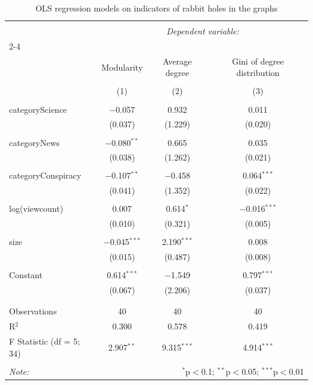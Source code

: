 
\begin{table}[!htbp] \centering 
  \caption{OLS regression models on indicators of rabbit holes in the graphs} 
  \label{} 
\begin{tabular}{@{\extracolsep{5pt}}lccc} 
\\[-1.8ex]\hline 
\hline \\[-1.8ex] 
 & \multicolumn{3}{c}{\textit{Dependent variable:}} \\ 
\cline{2-4} 
\\[-1.8ex] & Modularity & Average degree & Gini of degree distribution \\ 
\\[-1.8ex] & (1) & (2) & (3)\\ 
\hline \\[-1.8ex] 
 categoryScience & $-$0.057 & 0.932 & 0.011 \\ 
  & (0.037) & (1.229) & (0.020) \\ 
  & & & \\ 
 categoryNews & $-$0.080$^{**}$ & 0.665 & 0.035 \\ 
  & (0.038) & (1.262) & (0.021) \\ 
  & & & \\ 
 categoryConspiracy & $-$0.107$^{**}$ & $-$0.458 & 0.064$^{***}$ \\ 
  & (0.041) & (1.352) & (0.022) \\ 
  & & & \\ 
 log(viewcount) & 0.007 & 0.614$^{*}$ & $-$0.016$^{***}$ \\ 
  & (0.010) & (0.321) & (0.005) \\ 
  & & & \\ 
 size & $-$0.045$^{***}$ & 2.190$^{***}$ & 0.008 \\ 
  & (0.015) & (0.487) & (0.008) \\ 
  & & & \\ 
 Constant & 0.614$^{***}$ & $-$1.549 & 0.797$^{***}$ \\ 
  & (0.067) & (2.206) & (0.037) \\ 
  & & & \\ 
\hline \\[-1.8ex] 
Observations & 40 & 40 & 40 \\ 
R$^{2}$ & 0.300 & 0.578 & 0.419 \\ 
F Statistic (df = 5; 34) & 2.907$^{**}$ & 9.315$^{***}$ & 4.914$^{***}$ \\ 
\hline 
\hline \\[-1.8ex] 
\textit{Note:}  & \multicolumn{3}{r}{$^{*}$p$<$0.1; $^{**}$p$<$0.05; $^{***}$p$<$0.01} \\ 
\end{tabular} 
\end{table} 
